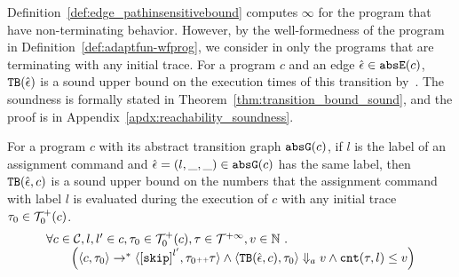 \begin{enumerate}
Definition~\ref{def:edge_pathinsensitivebound} computes $\infty$ for the program that
have non-terminating behavior.
However, by the well-formedness of the program in Definition~\ref{def:adaptfun-wfprog}, 
we consider in  only the programs that are terminating with any initial trace.
For a program $c$ and an edge $\hat{\mathtt{\epsilon}{}} \in \mathtt{abs}{\mathtt{E}}(c)$,
${\mathtt{TB}}(\hat{\mathtt{\epsilon}{}})$ is a sound upper bound
on the execution times of this transition by~\cite{SinnZV17}.
The soundness is formally stated in Theorem~\ref{thm:transition_bound_sound}, and the proof is in Appendix~\ref{apdx:reachability_soundness}.
%
\begin{thm}
 \label{thm:transition_bound_sound}
For a program ${c}$ with its abstract transition graph $\mathtt{abs}{\mathtt{G}}(c)$, if $l$ is the label of an assignment 
command and $\hat{\mathtt{\epsilon}{}} = (l, \_, \_) \in \mathtt{abs}{\mathtt{G}}(c)$ has the same label,
then ${\mathtt{TB}}(\hat{\mathtt{\epsilon}{}}, c)$ 
 is a sound upper bound on 
the numbers that the assignment command with label $l$ is evaluated during the execution of $c$ with any
initial trace $\mathtt{\tau}_0 \in \mathcal{T}^{+}_0(c)$.
 \[
 \begin{array}{l}
 \forall c \in \cdom, l, l' \in c,\trace_0 \in \ftdom_0(c), 
 \trace \in \tdom, v \in \mathbb{N}
 \sthat 
 \\ \qquad 
 \Big(\config{{c}, \trace_0} \to^{*} \config{\clabel{\eskip}^{l'}, \trace_0\tracecat\vtrace} 
 \land \config{\absclr(\absevent, c), \trace_0} \aarrow v
 \land
 \vcounter(\trace, l) \leq v
 \Big)
 \end{array}
 \]
\end{thm}
%
\end{enumerate}


